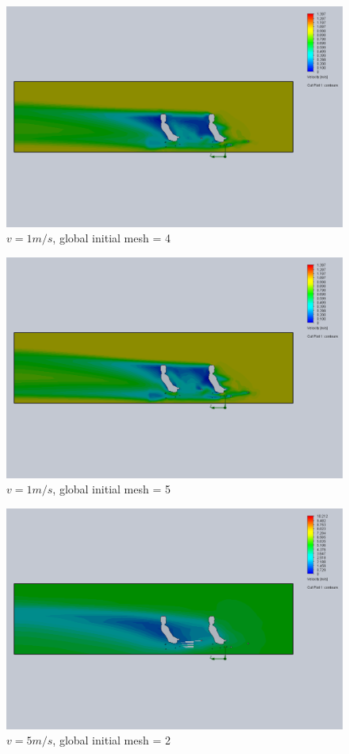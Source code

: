 \documentclass[11pt]{article}
\begin{document}
\begin{figure}
\includegraphics[width=\textwidth]{gm_4_rf_7_v01.png}
\caption{$v = 1 m/s$, global initial mesh = 4}
\end{figure}

\begin{figure}
\includegraphics[width=\textwidth]{gm_5_rf_7_v01.png}
\caption{$v = 1 m/s$, global initial mesh = 5}
\end{figure}


\begin{figure}
\includegraphics[width=\textwidth]{gm_2_rf_7_v05.png}
\caption{$v = 5 m/s$, global initial mesh = 2}
\end{figure}
\end{document}
